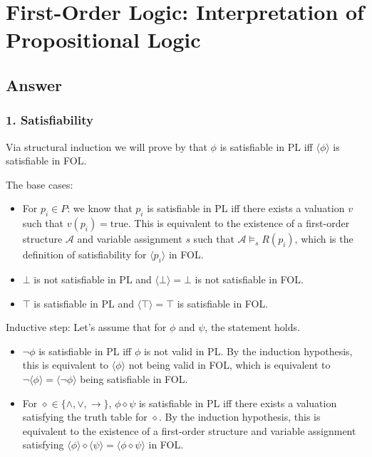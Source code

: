\documentclass{article}
\begin{document}
\section*{First-Order Logic: Interpretation of Propositional Logic}



\subsection*{Answer}

\subsubsection*{1. Satisfiability}

Via structural induction we will prove by that $\phi$ is satisfiable in PL iff $\langle\phi\rangle$ is 
satisfiable in FOL.

\vspace{1em}
The base cases:
\begin{itemize}
\item For $p_i \in P$: we know that $p_i$ is satisfiable in PL iff there exists a valuation $v$ such that $v(p_i) = \text{true}$. This is equivalent to the existence of a first-order structure $\mathcal{A}$ and variable assignment $s$ such that $\mathcal{A} \models_s R(p_i)$, which is the definition of satisfiability for $\langle p_i \rangle$ in FOL.
\item $\bot$ is not satisfiable in PL and $\langle\bot\rangle = \bot$ is not satisfiable in FOL.
\item $\top$ is satisfiable in PL and $\langle\top\rangle = \top$ is satisfiable in FOL.
\end{itemize}

Inductive step:
Let's assume that for $\phi$ and $\psi$, the statement holds.

\begin{itemize}
\item $\neg\phi$ is satisfiable in PL iff $\phi$ is not valid in PL. By the induction hypothesis, this is equivalent to $\langle\phi\rangle$ not being valid in FOL, which is equivalent to $\neg\langle\phi\rangle = \langle\neg\phi\rangle$ being satisfiable in FOL.

\item For $\diamond \in \{\wedge, \vee, \rightarrow\}$, $\phi \diamond \psi$ is satisfiable in PL iff there exists a valuation satisfying the truth table for $\diamond$. By the induction hypothesis, this is equivalent to the existence of a first-order structure and variable assignment satisfying $\langle\phi\rangle \diamond \langle\psi\rangle = \langle\phi \diamond \psi\rangle$ in FOL.
\end{itemize}
\end{document}
